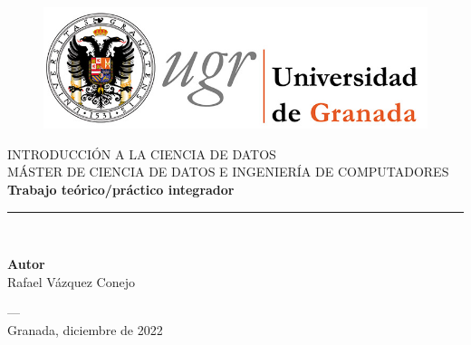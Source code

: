 
\begin{titlepage}
	\newlength{\centeroffset}
	\setlength{\centeroffset}{-0.5\oddsidemargin}
	\addtolength{\centeroffset}{0.5\evensidemargin}
	\thispagestyle{empty}
	
	\vspace{3cm}
	
	\begin{figure}[h!]
		\centering
		\includegraphics[width=1\linewidth]{figures/logo}
		\label{fig:logo}
	\end{figure}
	
	\vspace{0.5cm}
	\noindent\hspace*{\centeroffset}\begin{minipage}{\textwidth}
		
		\centering
		
		\textsc{ \Large INTRODUCCIÓN A LA CIENCIA DE DATOS\\[0.2cm]}
		\textsc{ MÁSTER DE CIENCIA DE DATOS E INGENIERÍA DE COMPUTADORES}\\[1cm]
		{\Huge\bfseries Trabajo teórico/práctico integrador\\
		}
		\noindent\rule[-1ex]{\textwidth}{3pt}\\[3.5ex]
	\end{minipage}
	

\vspace{1cm}
	\noindent\hspace*{\centeroffset}\begin{minipage}{\textwidth}
		\centering
		
		\textbf{Autor}\\ {Rafael Vázquez Conejo}\\[2.5ex]


	\end{minipage}

		

	
	
\vspace{1cm}



\noindent\hspace*{\centeroffset}\begin{minipage}{\textwidth}
	\centering
\textsc{---}\\
Granada, diciembre de 2022
\end{minipage}


\end{titlepage}